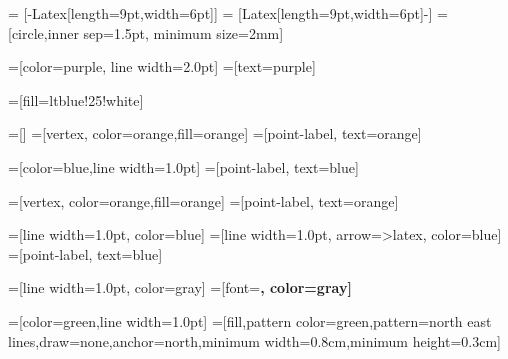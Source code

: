\usetikzlibrary{positioning,arrows.meta,shapes,calc,patterns}

 = [-{Latex[length=9pt,width=6pt]}]
 = [{Latex[length=9pt,width=6pt]}-]
=[circle,inner sep=1.5pt, minimum size=2mm]

=[color=purple, line width=2.0pt]
=[text=purple]

=[fill=ltblue!25!white]

=[]
=[vertex, color=orange,fill=orange]
=[point-label, text=orange]

=[color=blue,line width=1.0pt]
=[point-label, text=blue]


=[vertex, color=orange,fill=orange]
=[point-label, text=orange]

=[line width=1.0pt, color=blue]
=[line width=1.0pt, arrow=>latex, color=blue]
=[point-label, text=blue]


=[line width=1.0pt, color=gray]
=[font=\bfseries, color=gray]


=[color=green,line width=1.0pt]
=[fill,pattern color=green,pattern=north east lines,draw=none,anchor=north,minimum width=0.8cm,minimum height=0.3cm]
